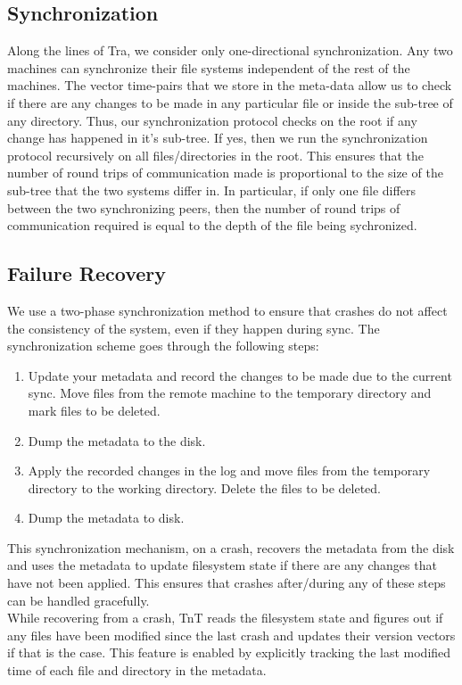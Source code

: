 \subsection{Synchronization}
Along the lines of Tra, we consider only one-directional synchronization. Any two machines can synchronize their file systems independent of the rest of the machines. The vector time-pairs that we store in the meta-data allow us to check if there are any changes to be made in any particular file or inside the sub-tree of any directory. Thus, our synchronization protocol checks on the root if any change has happened in it's sub-tree. If yes, then we run the synchronization protocol recursively on all files/directories in the root. This ensures that the number of round trips of communication made is proportional to the size of the sub-tree that the two systems differ in. In particular, if only one file differs between the two synchronizing peers, then the number of round trips of communication required is equal to the depth of the file being sychronized.

\subsection{Failure Recovery} \label{subsec:failure}
We use a two-phase synchronization method to ensure that crashes do not affect the consistency of the system, even if they happen during sync. The synchronization scheme goes through the following steps:
\begin{enumerate}
\item Update your metadata and record the changes to be made due to the current sync. Move files from the remote machine to the temporary directory and mark files to be deleted.
\item Dump the metadata to the disk.
\item Apply the recorded changes in the log and move files from the temporary directory to the working directory. Delete the files to be deleted.
\item Dump the metadata to disk.
\end{enumerate}
This synchronization mechanism, on a crash, recovers the metadata from the disk and uses the metadata to update filesystem state if there are any changes that have not been applied. This ensures that crashes after/during any of these steps can be handled gracefully.\\
While recovering from a crash, TnT reads the filesystem state and figures out if any files have been modified since the last crash and updates their version vectors if that is the case. This feature is enabled by explicitly tracking the last modified time of each file and directory in the metadata.


